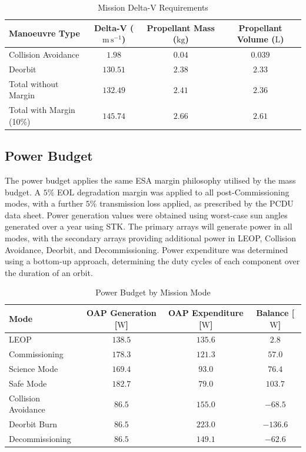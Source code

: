 \documentclass[a4paper, 11pt, conference]{IEEEtran}
\begin{document}
\begin{table}[!htbp]
\centering
\caption{Mission Delta-V Requirements}
\label{tab:deltaV}
\begin{tabular}{lccc}
\toprule
\textbf{Manoeuvre Type} & \textbf{Delta-V ($\mathrm{m\,s}^{-1}$)} & \textbf{Propellant Mass ($\mathrm{kg}$)} & \textbf{Propellant Volume ($\mathrm{L}$)} \\
\midrule
Collision Avoidance & $1.98$ & $0.04$ & $0.039$\\
Deorbit & $130.51$ & $2.38$ & $2.33$ \\
Total without Margin & $132.49$ & $2.41$ & $2.36$\\
\midrule
Total with Margin (10\%) & $145.74$ & $2.66$ & $2.61$\\
\bottomrule
\end{tabular}
\end{table}

\subsection{Power Budget}
The power budget applies the same ESA margin philosophy \cite{noauthor_sre-pa2011097_2012} utilised by the mass budget. A $5\%$ EOL degradation margin was applied to all post-Commissioning modes, with a further $5\%$ transmission loss applied, as prescribed by the PCDU data sheet. Power generation values were obtained using worst-case sun angles generated over a year using STK. The primary arrays will generate power in all modes, with the secondary arrays providing additional power in LEOP, Collision Avoidance, Deorbit, and Decommissioning. Power expenditure was determined using a bottom-up approach, determining the duty cycles of each component over the duration of an orbit. 
\begin{table}[!htbp]
\centering
\caption{Power Budget by Mission Mode}
\label{tab:power_budget}
\begin{tabular}{lccc}
\toprule
\textbf{Mode} & \textbf{OAP Generation [$\mathrm{W}$]} & \textbf{OAP Expenditure [$\mathrm{W}$]} & \textbf{Balance [$\mathrm{W}$]} \\
\midrule
LEOP & $138.5$ & $135.6$ & $2.8$ \\
Commissioning & $178.3$ & $121.3$ & $57.0$ \\
Science Mode & $169.4$ & $93.0$ & $76.4$ \\
Safe Mode & $182.7$ & $79.0$ & $103.7$ \\
Collision Avoidance & $86.5$ & $155.0$ & $-68.5$ \\
Deorbit Burn & $86.5$ & $223.0$ & $-136.6$ \\
Decommissioning & $86.5$ & $149.1$ & $-62.6$ \\
\bottomrule
\end{tabular}
\end{table}
\end{document}
